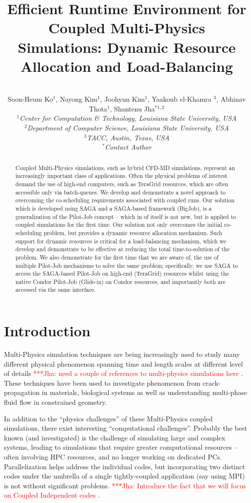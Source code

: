\documentclass[conference,final]{IEEEtran}
\title{Efficient Runtime Environment for Coupled Multi-Physics Simulations: Dynamic Resource Allocation and Load-Balancing}
\author{
  ~\\[-2em]
  Soon-Heum Ko$^{1}$, Nayong Kim$^{1}$, Joohyun Kim$^{1}$, Yaakoub el-Khamra $^{3}$, Abhinav Thota$^{1}$, Shantenu Jha$^{*1,2}$\\
  \small{\emph{$^{1}$Center for Computation \& Technology, Louisiana State University, USA}}\\
  \small{\emph{$^{2}$Department of Computer Science, Louisiana State University, USA}}\\
  \small{\emph{$^{3}$TACC, Austin, Texas, USA}}\\
  \small{\emph{$^{*}$Contact Author}}\\
}
\newcommand{\jhanote}[1]{ {\textcolor{red} { ***Jha: #1 }}}
\newcommand{\jhanote}[1]{}
\begin{document}
\maketitle

\begin{abstract}
  Coupled Multi-Physics simulations, such as hybrid CFD-MD simulations, represent an increasingly important class of applications.  Often the physical problems of interest demand the use of high-end computers, such as TeraGrid resources, which are often accessible only via batch-queues.  We develop and demonstrate a novel approach to overcoming the co-scheduling requirements associated with coupled runs.  Our solution which is developed using SAGA and a SAGA-based framework (BigJob), is a generalization of the Pilot-Job concept -- which in of itself is not new, but is applied to coupled simulations for the first time.  Our solution not only overcomes the initial co-scheduling problem, but provides a dynamic resource allocation mechanism. Such support for dynamic resources is critical for a load-balancing mechanism, which we develop and demonstrate to be effective at reducing the total time-to-solution of the problem.  We also demonstrate for the first time that we are aware of, the use of multiple Pilot-Job mechanisms to solve the same problem; specifically, we use SAGA to access the SAGA-based Pilot-Job on high-end (TeraGrid) resources whilst using the native Condor Pilot-Job (Glide-in) on Condor resources, and importantly both are accessed via the same interface. 
\end{abstract}


\section{Introduction} 

Multi-Physics simulation techniques are being increasingly used to study many different physical phenomenon spanning time and length scales at different level of details\jhanote{need a couple of references to multi-physics simulations here}. These techniques have been used to investigate phenomenon from crack-propagation in materials, biological systems as well as understanding multi-phase fluid flow in constrained geometry.

In addition to the ``physics challenges'' of these Multi-Physics coupled simulations, there exist interesting ``computational challenges''.  Probably the best known (and investigated) is the challenge of simulating large and complex systems, leading to simulations that require greater computational resources -- often involving HPC resources, and no longer working on dedicated PCs. Parallelization helps address the individual codes, but incorporating two distinct codes under the umbrella of a single tightly-coupled application (say using MPI) is not without significant problems.  \jhanote{Introduce the fact that we will focus on Coupled Independent codes}. 
\end{document}

